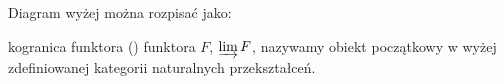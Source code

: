 Diagram wyżej można rozpisać jako:
\begin{center}
\end{center}

\begin{definition}{kogranica funktora}{}
   () funktora $F$, $\varinjlim F$, nazywamy obiekt początkowy w wyżej zdefiniowanej kategorii naturalnych przekształceń. 
\end{definition}

